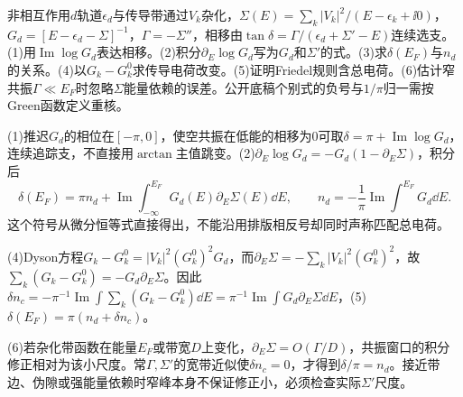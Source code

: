 \begin{exercise}[原题1--6]
非相互作用$d$轨道$\epsilon_d$与传导带通过$V_k$杂化，$\Sigma(E)=\sum_k|V_k|^2/(E-\epsilon_k+\ii0)$，$G_d=[E-\epsilon_d-\Sigma]^{-1}$，$\Gamma=-\Sigma''$，相移由$\tan\delta=\Gamma/(\epsilon_d+\Sigma'-E)$连续选支。(1)用$\operatorname{Im}\log G_d$表达相移。(2)积分$\partial_E\log G_d$写为$G_d$和$\Sigma'$的式。(3)求$\delta(E_F)$与$n_d$的关系。(4)以$G_k-G_k^0$求传导电荷改变。(5)证明Friedel规则含总电荷。(6)估计窄共振$\Gamma\ll E_F$时忽略$\Sigma$能量依赖的误差。公开底稿个别式的负号与$1/\pi$归一需按Green函数定义重核。
\end{exercise}
\begin{solution}
(1)推迟$G_d$的相位在$[-\pi,0]$，使空共振在低能的相移为0可取$\delta=\pi+\operatorname{Im}\log G_d$，连续追踪支，不直接用$\arctan$主值跳变。(2)$\partial_E\log G_d=-G_d(1-\partial_E\Sigma)$，积分后
\begin{equation}
\delta(E_F)=\pi n_d+\operatorname{Im}\int_{-\infty}^{E_F}G_d(E)\partial_E\Sigma(E)\dd E,\qquad n_d=-\frac1\pi\operatorname{Im}\int^{E_F}G_d\dd E.
\end{equation}
这个符号从微分恒等式直接得出，不能沿用排版相反号却同时声称匹配总电荷。

(4)Dyson方程$G_k-G_k^0=|V_k|^2(G_k^0)^2G_d$，而$\partial_E\Sigma=-\sum_k|V_k|^2(G_k^0)^2$，故$\sum_k(G_k-G_k^0)=-G_d\partial_E\Sigma$。因此$\delta n_c=-\pi^{-1}\operatorname{Im}\int\sum_k(G_k-G_k^0)\dd E=\pi^{-1}\operatorname{Im}\int G_d\partial_E\Sigma\dd E$，(5)$\delta(E_F)=\pi(n_d+\delta n_c)$。

(6)若杂化带函数在能量$E_F$或带宽$D$上变化，$\partial_E\Sigma=O(\Gamma/D)$，共振窗口的积分修正相对为该小尺度。常$\Gamma,\Sigma'$的宽带近似使$\delta n_c=0$，才得到$\delta/\pi=n_d$。接近带边、伪隙或强能量依赖时窄峰本身不保证修正小，必须检查实际$\Sigma'$尺度。
\end{solution}
